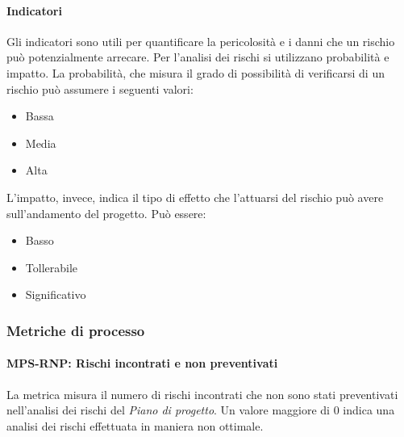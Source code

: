 \documentclass[../../norme-di-progetto.tex]{subfiles}
\begin{document}
\paragraph{Indicatori}%
\label{par:indicatori}

Gli indicatori sono utili per quantificare la pericolosità e i danni che un rischio può potenzialmente arrecare. Per l'analisi dei rischi si utilizzano probabilità e impatto. La probabilità, che misura il grado di possibilità di verificarsi di un rischio può assumere i seguenti valori:
\begin{itemize}
  \item Bassa
  \item Media
  \item Alta
\end{itemize}
L'impatto, invece, indica il tipo di effetto che l'attuarsi del rischio può avere sull'andamento del progetto. Può essere:
\begin{itemize}
  \item Basso
  \item Tollerabile
  \item Significativo
\end{itemize}

\subsubsection{Metriche di processo}%
\label{subs:gestione_dei_rischi/metriche_di_processo}

\paragraph{MPS-RNP\@: Rischi incontrati e non preventivati}%
\label{par:MPS-RNP_rischi_incontrati_e_non_preventivati}

La metrica misura il numero di rischi incontrati che non sono stati preventivati nell'analisi dei rischi del \textit{Piano di progetto}. Un valore maggiore di 0 indica una analisi dei rischi effettuata in maniera non ottimale.
\end{document}
